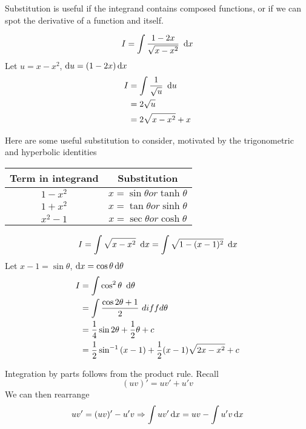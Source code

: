 \documentclass{article}
\begin{document}
\begin{defi}[Substitution]
    Substitution is useful if the integrand contains composed functions, or if we can spot the derivative of a function and itself.
\end{defi}
\begin{eg}
    \[
        I = \int{\frac{1 - 2x}{\sqrt{x - x^2}} \ \diffd x}
    \]
    Let $u = x - x^2$, $\mathop{}\!\mathrm{d} u = (1 - 2x) \mathop{}\!\mathrm{d} x$
    \begin{align*}
        I &= \int{\frac{1}{\sqrt{u}} \ \mathop{}\!\mathrm{d}u} \\
        &= 2\sqrt{u} \\
        &= 2\sqrt{x - x^2} + x
    \end{align*}
\end{eg}
Here are some useful substitution to consider, motivated by the trigonometric and hyperbolic identities
\begin{center}
    \begin{tabular}{c | c}
        Term in integrand & Substitution \\
        \midrule
        $1 - x^2$ & $x = \sin{\theta} or \tanh{\theta}$\\
        $1 + x^2$ & $x = \tan{\theta} or \sinh{\theta}$\\
        $x^2 - 1$ & $x = \sec{\theta} or \cosh{\theta}$\\

    \end{tabular}
\end{center}

\begin{eg}
    \[
        I = \int{\sqrt{x - x^2} \ \mathop{}\!\mathrm{d}x} = \int{\sqrt{1 - (x - 1)^2} \ \mathop{}\!\mathrm{d}x}    
    \]
    Let $x - 1 = \sin{\theta}$, $\mathop{}\!\mathrm{d} x = \cos{\theta} \mathop{}\!\mathrm{d} \theta$
    \begin{align*}
        I &= \int{\cos^2{\theta} \ \mathop{}\!\mathrm{d}\theta} \\
        &= \int{\frac{\cos{2\theta} + 1}{2}} \ diffd \theta \\
        &= \frac{1}{4}\sin{2\theta} + \frac{1}{2}\theta + c \\
        &= \frac{1}{2}\sin^{-1}{(x-1)} + \frac{1}{2}(x-1)\sqrt{2x - x^2} + c
    \end{align*}
\end{eg}

\begin{defi}[By parts]
    Integration by parts follows from the product rule. Recall
    \[
        (uv)' = uv' + u'v
    \]
    We can then rearrange
    \[
        uv' = (uv)' - u'v \Rightarrow \int{uv' \mathop{}\!\mathrm{d}x} = uv - \int{u'v \mathop{}\!\mathrm{d}x}
    \]
\end{defi}
\end{document}
